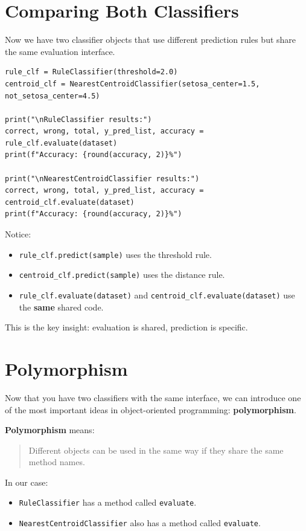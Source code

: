 \section{Comparing Both Classifiers}

Now we have two classifier objects that use different prediction rules but share the same evaluation interface.

\begin{verbatim}
rule_clf = RuleClassifier(threshold=2.0)
centroid_clf = NearestCentroidClassifier(setosa_center=1.5, not_setosa_center=4.5)

print("\nRuleClassifier results:")
correct, wrong, total, y_pred_list, accuracy = rule_clf.evaluate(dataset)
print(f"Accuracy: {round(accuracy, 2)}%")

print("\nNearestCentroidClassifier results:")
correct, wrong, total, y_pred_list, accuracy = centroid_clf.evaluate(dataset)
print(f"Accuracy: {round(accuracy, 2)}%")
\end{verbatim}

\noindent
Notice:
\begin{itemize}\setlength{\itemsep}{2pt}
    \item \texttt{rule\_clf.predict(sample)} uses the threshold rule.
    \item \texttt{centroid\_clf.predict(sample)} uses the distance rule.
    \item \texttt{rule\_clf.evaluate(dataset)} and \texttt{centroid\_clf.evaluate(dataset)} use the \textbf{same} shared code.
\end{itemize}

\noindent
This is the key insight: evaluation is shared, prediction is specific.

\section{Polymorphism}

Now that you have two classifiers with the same interface, we can introduce one of the most important ideas in object-oriented programming: \textbf{polymorphism}.

\medskip
\noindent
\textbf{Polymorphism} means:
\begin{quote}
Different objects can be used in the same way if they share the same method names.
\end{quote}

\noindent
In our case:
\begin{itemize}
    \item \texttt{RuleClassifier} has a method called \texttt{evaluate}.
    \item \texttt{NearestCentroidClassifier} also has a method called \texttt{evaluate}.
\end{itemize}


